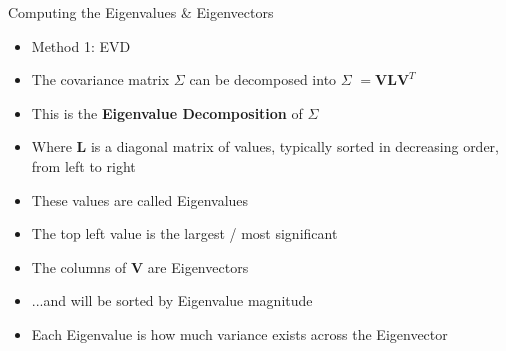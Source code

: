 \documentclass[aspectratio=169]{beamer}
\begin{document}
\begin{frame}{Computing the  Eigenvalues \& Eigenvectors}
\begin{itemize}
	\item Method 1: EVD
	\item The covariance matrix \textbf{$\Sigma$} can be decomposed into \textbf{$\Sigma$} $= \textbf{V}\textbf{L}\textbf{V}^T$ %
	\item This is the \textbf{Eigenvalue Decomposition} of \textbf{$\Sigma$}
	\item Where $\textbf{L}$ is a diagonal matrix of values, typically sorted in decreasing order, from left to right
	\item These values are called Eigenvalues
	\item The top left value is the largest / most significant
	\item The columns of $\textbf{V}$ are Eigenvectors
	\item ...and will be sorted by Eigenvalue magnitude
	\item Each Eigenvalue is how much variance exists across the Eigenvector
\end{itemize}
\end{frame}
\end{document}
